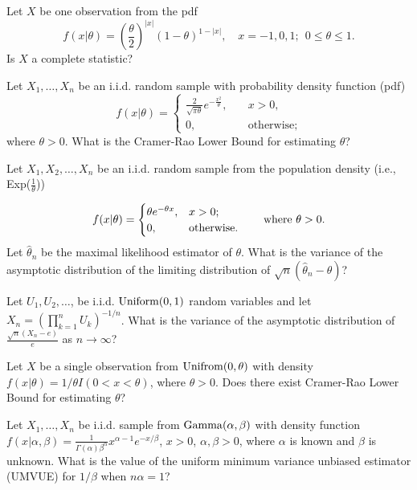 \begin{problem}Let $X$ be one observation from the pdf
	\[
	f(x|\theta) = \left(\frac{\theta}{2}\right)^{|x|}(1-\theta)^{1-|x|}, \quad x=-1, 0, 1; \ \ 0\le \theta \le 1.
	\]
	Is $X$ a complete statistic?
\end{problem}

\begin{problem} Let $X_1, \ldots, X_n$ be an i.i.d. random sample with probability density function (pdf) 
	\begin{equation*}
		f(x|\theta) = \begin{cases}
			\frac{2}{\sqrt{\pi \theta}}e^{-\frac{x^2}{\theta}}, \quad &x>0, \\
			0, \quad &\text{otherwise};
		\end{cases}	
	\end{equation*}
	where $\theta>0$. What is the Cramer-Rao Lower Bound for estimating $\theta$?
\end{problem}

\begin{problem}Let $X_1, X_2, \ldots, X_n$ be an i.i.d. random sample from the population density (i.e., Exp($\frac{1}{\theta}$))
	
	\[ f(x|\theta)=\begin{cases} 
		\theta e^{-\theta x}, &  x>0; \\
		0, &  \text{\rm otherwise}.
	\end{cases} \qquad \text{\rm where } \theta>0.
	\]
	Let $\hat{\theta}_n$ be the maximal likelihood estimator of $\theta$. What is the variance of the asymptotic distribution of the limiting distribution of $\sqrt{n}(\hat{\theta}_n - \theta)$? 
\end{problem}

\begin{problem} Let $U_1, U_2, \ldots$, be i.i.d. ${\rm Uniform}(0,1)$ random variables and let $X_n=\left(\prod_{k=1}^{n} U_k\right)^{-1/n}$. What is the variance of the asymptotic distribution of $\frac{\sqrt{n}(X_n-e)}{e}$ as $n\to \infty$?
\end{problem}

\begin{problem} Let $X$ be a single observation from ${\rm Unifrom}(0,\theta)$ with density $f(x|\theta)=1/\theta I(0<x<\theta)$, where $\theta>0$. Does there exist Cramer-Rao Lower Bound for estimating $\theta$?
\end{problem}

\begin{problem} Let $X_1, \ldots, X_n$ be i.i.d. sample from ${\rm Gamma}(\alpha,\beta)$ with density function $f(x|\alpha,\beta) = \frac{1}{\Gamma(\alpha)\beta^\alpha}x^{\alpha-1}e^{-x/\beta}$, $x>0$, $\alpha,\beta>0$, where $\alpha$ is known and $\beta$ is unknown. What is the value of the uniform minimum variance unbiased estimator (UMVUE) for $1/\beta$ when $n\alpha = 1$? 
\end{problem}

